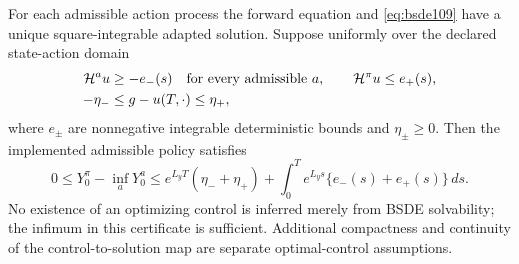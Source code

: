 \begin{proposition}\label{prop:bsde109}
For each admissible action process the forward equation and \eqref{eq:bsde109} have a unique square-integrable adapted solution. Suppose uniformly over the declared state-action domain
\begin{align*}
 \mathcal H^a u&\ge-e_-(s)\quad\hbox{for every admissible }a,\qquad
 \mathcal H^{\pi}u\le e_+(s),\\
 -\eta_-&\le g-u(T,\cdot)\le\eta_+,
\end{align*}
where $e_\pm$ are nonnegative integrable deterministic bounds and $\eta_\pm\ge0$. Then the implemented admissible policy satisfies
\begin{equation}\label{eq:bsdegap109}
 0\le Y_0^\pi-\inf_aY_0^a
 \le e^{L_yT}(\eta_-+\eta_+)
       +\int_0^T e^{L_ys}\{e_-(s)+e_+(s)\}\,ds.
\end{equation}
No existence of an optimizing control is inferred merely from BSDE solvability; the infimum in this certificate is sufficient. Additional compactness and continuity of the control-to-solution map are separate optimal-control assumptions.
\end{proposition}

